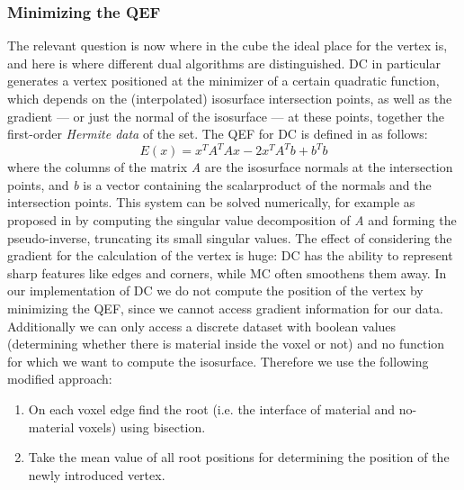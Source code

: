 \subsubsection{Minimizing the \acl{QEF}}
The relevant question is now where in the cube the ideal place for the vertex is, and here is where different dual algorithms are distinguished. \Ac{DC} in particular generates a vertex positioned at the minimizer of a certain quadratic function, which depends on the (interpolated) isosurface intersection points, as well as the gradient --- or just the normal of the isosurface --- at these points, together the first-order \emph{Hermite data} of the set.
The \acf{QEF} for \ac{DC} is defined in \cite{Hermite2002} as follows:
\begin{equation*}
E(x)= x^TA^TAx-2x^TA^Tb+b^Tb
\end{equation*}
where the columns of the matrix \textit{A} are the  isosurface normals at the intersection points, and \textit{b} is a vector containing the scalarproduct of the normals and the intersection points. This system can be solved numerically, for example as proposed in \cite{Hermite2002} by computing the singular value decomposition of \textit{A} and forming the pseudo-inverse, truncating its small singular values. 
The effect of considering the gradient for the calculation of the vertex is huge: \ac{DC} has the ability to represent sharp features like edges and corners, while \ac{MC} often smoothens them away.
In our implementation of \ac{DC} we do not compute the position of the vertex by minimizing the \ac{QEF}, since we cannot access gradient information for our data. Additionally we can only access a discrete dataset with boolean values (determining whether there is material inside the voxel or not) and no function for which we want to compute the isosurface. Therefore we use the following modified approach:
\begin{enumerate}
\item On each voxel edge find the root (i.e. the interface of material and no-material voxels) using bisection.
\item Take the mean value of all root positions for determining the position of the newly introduced vertex.
\end{enumerate}


